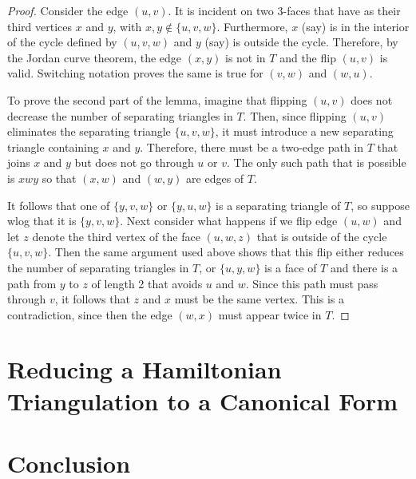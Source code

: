 \documentclass{article}
\begin{document}
\begin{proof}
Consider the edge $(u,v)$.  It is incident on two 3-faces that have as
their third vertices $x$ and $y$, with $x,y\notin\{u,v,w\}$.
Furthermore, $x$ (say) is in the interior of the cycle defined by
$(u,v,w)$ and $y$ (say) is outside the cycle. Therefore, by the Jordan
curve theorem, the edge $(x,y)$ is not in $T$ and the flip $(u,v)$ is
valid.  Switching notation proves the same is true for $(v,w)$ and
$(w,u)$.

To prove the second part of the lemma, imagine that flipping $(u,v)$
does not decrease the number of separating triangles in $T$.  Then,
since flipping $(u,v)$ eliminates the separating triangle $\{u,v,w\}$,
it must introduce a new separating triangle containing $x$ and $y$.
Therefore, there must be a two-edge path in $T$ that joins $x$ and $y$
but does not go through $u$ or $v$.  The only such path that is
possible is $xwy$ so that $(x,w)$ and $(w,y)$ are edges of $T$.

It follows that one of $\{y,v,w\}$ or $\{y,u,w\}$ is a separating
triangle of $T$, so suppose wlog that it is $\{y,v,w\}$.  Next
consider what happens if we flip edge $(u,w)$ and let $z$ denote the
third vertex of the face $(u,w,z)$ that is outside of the cycle
$\{u,v,w\}$.  Then the same argument used above shows that this flip
either reduces the number of separating triangles in $T$, or
$\{u,y,w\}$ is a face of $T$ and there is a path from $y$ to $z$ of
length 2 that avoids $u$ and $w$.  Since this path must pass through
$v$, it follows that $z$ and $x$ must be the same vertex.  This is a
contradiction, since then the edge $(w,x)$ must appear twice in $T$.
\end{proof}


\section{Reducing a Hamiltonian Triangulation to a Canonical Form}

\section{Conclusion}
\end{document}
